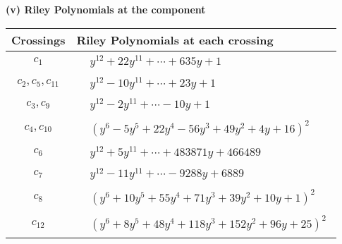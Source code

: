 \documentclass[1p]{elsarticle_modified}
\theoremstyle{definition}
\begin{document}
\newpage\renewcommand{\arraystretch}{1}
\flushleft \textbf{(v) Riley Polynomials at the component}\newline \\
\begin{tabular}{m{50pt}|m{274pt}}
Crossings & \hspace{64pt}Riley Polynomials at each crossing \\
\hline $$\begin{aligned}c_{1}\end{aligned}$$&$\begin{aligned}
&y^{12}+22 y^{11}+\cdots+635 y+1
\end{aligned}$\\
\hline $$\begin{aligned}c_{2},c_{5},c_{11}\end{aligned}$$&$\begin{aligned}
&y^{12}-10 y^{11}+\cdots+23 y+1
\end{aligned}$\\
\hline $$\begin{aligned}c_{3},c_{9}\end{aligned}$$&$\begin{aligned}
&y^{12}-2 y^{11}+\cdots-10 y+1
\end{aligned}$\\
\hline $$\begin{aligned}c_{4},c_{10}\end{aligned}$$&$\begin{aligned}
&(y^6-5 y^5+22 y^4-56 y^3+49 y^2+4 y+16)^2
\end{aligned}$\\
\hline $$\begin{aligned}c_{6}\end{aligned}$$&$\begin{aligned}
&y^{12}+5 y^{11}+\cdots+483871 y+466489
\end{aligned}$\\
\hline $$\begin{aligned}c_{7}\end{aligned}$$&$\begin{aligned}
&y^{12}-11 y^{11}+\cdots-9288 y+6889
\end{aligned}$\\
\hline $$\begin{aligned}c_{8}\end{aligned}$$&$\begin{aligned}
&(y^6+10 y^5+55 y^4+71 y^3+39 y^2+10 y+1)^2
\end{aligned}$\\
\hline $$\begin{aligned}c_{12}\end{aligned}$$&$\begin{aligned}
&(y^6+8 y^5+48 y^4+118 y^3+152 y^2+96 y+25)^2
\end{aligned}$\\
\hline
\end{tabular}\\~\\
\end{document}

